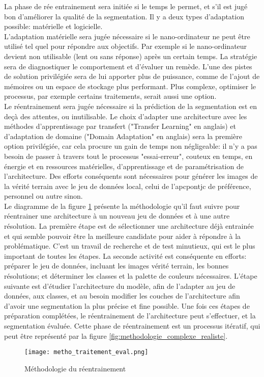 ﻿\noindent La phase de rée entrainement sera initiée si le temps le permet, et s'il est jugé bon d'améliorer la qualité de la segmentation. Il y a deux types d'adaptation possible: matérielle et logicielle.
\vspace{0.5\baselineskip}
\\
\noindent L'adaptation matérielle sera jugée nécessaire si le nano-ordinateur ne peut être utilisé tel quel pour répondre aux objectifs. Par exemple si le nano-ordinateur devient non utilisable (lent ou sans réponse) après un certain temps. La stratégie sera de diagnostiquer le comportement et d'évaluer un remède. L'une des pistes de solution privilégiée sera de lui apporter plus de puissance, comme de l'ajout de mémoires ou un espace de stockage plus performant. Plus complexe, optimiser le processus, par exemple certains traitements, serait aussi une option.
\vspace{0.5\baselineskip}
\\
\noindent Le réentrainement sera jugée nécessaire si la prédiction de la segmentation est en deçà des attentes, ou inutilisable. Le choix d'adapter une architecture avec les méthodes d'apprentissage par transfert ("Transfer Learning" en anglais) et d'adaptation de domaine ("Domain Adaptation" en anglais) sera la première option privilégiée, car cela procure un gain de temps non négligeable: il n'y a pas besoin de passer à travers tout le processus "essai-erreur", couteux en temps, en énergie et en ressources matérielles, d'apprentissage et de paramétrisation de l'architecture. Des efforts conséquents sont nécessaires pour générer les images de la vérité terrain avec le jeu de données local, celui de l'\acrshort{apcpontjc} de préférence, personnel ou autre sinon.
\vspace{0.5\baselineskip}
\\
\noindent Le diagramme de la figure \ref{fig:metho_adaptation} présente la méthodologie qu'il faut suivre pour réentrainer une architecture à un nouveau jeu de données et à une autre résolution. La première étape est de sélectionner une architecture déjà entrainée et qui semble pouvoir être la meilleure candidate pour aider à répondre à la problématique. C'est un travail de recherche et de test minutieux, qui est le plus important de toutes les étapes. La seconde activité est conséquente en efforts: préparer le jeu de données, incluant les images vérité terrain, les bonnes résolutions; et déterminer les classes et la palette de couleurs nécessaires. L'étape suivante est d'étudier l'architecture du modèle, afin de l'adapter au jeu de données, aux classes, et au besoin modifier les couches de l'architecture afin d'avoir une segmentation la plus précise et fine possible. Une fois ces étapes de préparation complétées, le réentrainement de l'architecture peut s'effectuer, et la segmentation évaluée. Cette phase de réentrainement est un processus itératif, qui peut être représenté par la figure \ref{fig:methodologie_complexe_realiste}.
\label{metho_adaptation}
\begin{figure}[H]
    \centering
    \texttt{[image: metho\_traitement\_eval.png]}
    \caption{Méthodologie du réentrainement}
    \label{fig:metho_adaptation}
\end{figure}